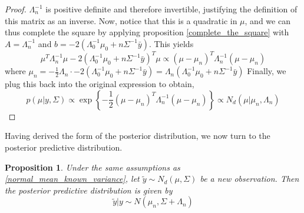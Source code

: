\documentclass[12pt]{article}
\newtheorem{prop}{Proposition}
\begin{document}
\begin{proof}
$\Lambda_n^{-1}$ is positive definite and therefore invertible, justifying the definition of this matrix as an inverse. 
Now, notice that this is a quadratic in $\mu$, and we can thus complete the square by applying proposition \ref{complete_the_square}
with $A = \Lambda_n^{-1 }$ and $b = - 2(\Lambda_0^{-1} \mu_0 + n\Sigma^{-1} \bar{y})$. This yields
\[\mu^T \Lambda_n^{-1 }\mu - 2(\Lambda_0^{-1} \mu_0 + n\Sigma^{-1} \bar{y})^T \mu \propto (\mu - \mu_n)^T \Lambda_n^{-1 } (\mu - \mu_n)\]
where $\mu_n = -\frac{1}{2} \Lambda_n \cdot - 2(\Lambda_0^{-1} \mu_0 + n\Sigma^{-1} \bar{y}) = \Lambda_n(\Lambda_0^{-1} \mu_0 + n\Sigma^{-1} \bar{y})$
Finally, we plug this back into the original expression to obtain, 
\[p(\mu|y, \Sigma) \propto \exp\left\{-\frac{1}{2}(\mu - \mu_n)^T \Lambda_n^{-1 } (\mu - \mu_n) \right\} \propto N_d(\mu | \mu_n, \Lambda_n)\]
\end{proof}

Having derived the form of the posterior distribution, we now turn to the posterior predictive distribution. 
\begin{prop}
Under the same assumptions as \ref{normal_mean_known_variance}, let $\tilde{y} \sim N_d(\mu, \Sigma)$ be a new observation. Then the posterior predictive distribution is given by
\[\tilde{y}|y \sim N(\mu_n, \Sigma + \Lambda_n)\]
\end{prop}
\end{document}
